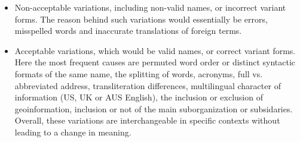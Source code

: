 \documentclass{llncs}
\begin{document}
\begin{itemize}
 \item Non-acceptable variations, including non-valid names, or incorrect
variant forms. The reason behind such variations would essentially be
errors, misspelled words and inaccurate translations of foreign terms.

\item Acceptable variations, which would be valid names, or correct variant
forms. Here the most frequent causes are permuted word order or distinct
syntactic formats of the same name, the splitting of words, acronyms, full
vs. abbreviated address, transliteration differences, multilingual character 
of information (US, UK or AUS English), the inclusion or exclusion of geoinformation, 
inclusion or not of the main suborganization or subsidaries. Overall, these variations are 
interchangeable in specific contexts without leading to a change in meaning.
\end{itemize}



% 
% 
% 
\end{document}
